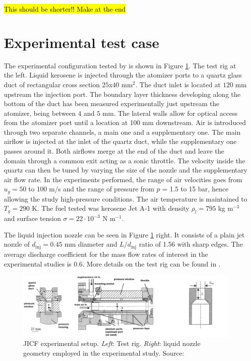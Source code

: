 \hl{This should be shorter!! Make at the end}

\section{Experimental test case}
	\label{sec:ch5_experimental_bench}

The experimental configuration tested by  is shown in Figure \ref{fig:experiment_JICF_DLR}. The test rig at the left. Liquid kerosene is injected through the atomizer ports to a quartz glass duct of rectangular cross section $25$x$40$ mm$^2$. The duct inlet is located at $120$ mm upstream the injection port. The boundary layer thickness developing along the bottom of the duct has been measured experimentally just upstream the atomizer, being between $4$ and $5$ mm. The lateral walls allow for optical access from the atomizer port until a location at 100 mm downstream. Air is introduced through two separate channels, a main one and a supplementary one. The main airflow is injected at the inlet of the quartz duct, while the supplementary one passes around it. Both airflows merge at the end of the duct and leave the domain through a common exit acting as a sonic throttle. The velocity inside the quartz can then be tuned by varying the size of the nozzle and the supplementary air flow rate. In the experiments performed, the range of air velocities goes from $u_g = 50$ to 100 m/s and the range of pressure from $p$ = 1.5 to 15 bar, hence allowing the study high-pressure conditions. The air temperature is maintained to $T_g = 290$ K. The fuel tested was kerosene Jet A-1 with density $\rho_l = 795$ kg m$^{-3}$ and surface tension $\sigma = 22 \cdot 10^{-3}$ N m$^{-1}$.

The liquid injection nozzle can be seen in Figure \ref{fig:experiment_JICF_DLR} right. It consists of a plain jet nozzle of $d_\mathrm{inj} =  0.45$ mm diameter and $L/d_\mathrm{inj}$ ratio of 1.56 with sharp edges. The average discharge coefficient for the mass flow rates of interest in the experimental studies is $0.6$. More details on the test rig can be found in .

\clearpage

\begin{figure}[h!]
	\centering
	\includegraphics[scale=0.35]{./part2_developments/figures_ch5_resolved_JICF/experiment_JICF_DLR}
	\caption[JICF experimental setup]{JICF experimental setup. \textsl{Left}: Test rig. \textsl{Right}: liquid nozzle geometry employed in the experimental study. Source: }
	\label{fig:experiment_JICF_DLR}
\end{figure}




